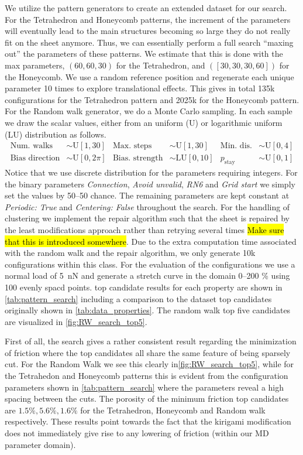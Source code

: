 We utilize the pattern generators to create an extended dataset for our search. For the Tetrahedron and Honeycomb patterns, the increment of the parameters will eventually lead to the main structures becoming so large they do not really fit on the sheet anymore. Thus, we can essentially perform a
full search ``maxing out'' the parameters of these patterns. We estimate
that this is done with the max parameters, $(60, 60, 30)$ for the Tetrahedron,
and $([30, 30, 30, 60])$ for the Honeycomb. We use a random reference position
and regenerate each unique parameter 10 times to explore translational effects. This gives in total 135k configurations for the
Tetrahedron pattern and 2025k for the Honeycomb pattern. For the Random walk
generator, we do a Monte Carlo sampling. In each sample we draw the scalar values, either from an uniform (U) or logarithmic uniform (LU) distribution as follows.
\begin{align*}
  \text{Num. walks} &\sim \text{U}[1, 30] & \text{Max. steps} &\sim \text{U}[1,30]  & \text{Min. dis.} &\sim \text{U}[0,4] \\
  \text{Bias direction} &\sim \text{U}[0, 2\pi] & \text{Bias. strength} &\sim \text{LU}[0,10]  & p_{\text{stay}} &\sim \text{U}[0,1]  
\end{align*}
Notice that we use discrete distribution for the parameters requiring integers. For the binary parameters \textit{Connection}, \textit{Avoid unvalid},
\textit{RN6} and \textit{Grid start} we simply set the values by 50--50 chance. The
remaining parameters are kept constant at \textit{Periodic: True} and \textit{Centering:
False} throughout the search. For the handling of clustering we implement the
repair algorithm such that the sheet is repaired by the least modifications
approach rather than retrying several times \hl{Make sure that this is
introduced somewhere}. Due to the extra computation time associated with the
random walk and the repair algorithm, we only generate 10k configurations within
this class. For the evaluation of the configurations we use a normal load of \SI{5}{nN} and generate a stretch curve in the domain 0--200 \% using 100 evenly spacd points. top candidate results for each property are shown in
\cref{tab:pattern_search} including a comparison to the dataset top candidates
originally shown in \cref{tab:data_properties}. The random walk top five candidates are visualized in \cref{fig:RW_search_top5}.

First of all, the search gives a rather consistent result regarding the minimization of friction where the top candidates all share the same feature of being sparsely cut. For the Random Walk we see this clearly in\cref{fig:RW_search_top5}, while for the Tetrahedon and Honeycomb patterns this is evident from the configuration parameters shown in
\cref{tab:pattern_search} where the parameters reveal a high spacing between the
cuts. The porosity of the minimum friction top candidates are $1.5\%, 5.6\%, 1.6\%$ for the
Tetrahedron, Honeycomb and Random walk respectively. These results point towards the fact that the kirigami modification does not immediately give rise to any lowering of friction (within our \acrshort{MD} parameter domain).

